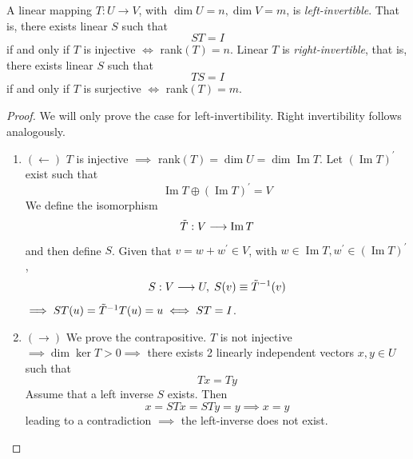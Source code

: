 \documentclass{article}
\DeclareMathOperator{\im}{Im}
\begin{document}
    \begin{theorem}
      A linear mapping $T: U \longrightarrow V$, with $\dim{U} = n, \dim{V} = m$, is \textit{left-invertible}. That is, there exists linear $S$ such that 
      \begin{equation}
        S T = I
      \end{equation}
      if and only if $T$ is injective $\iff$ rank$(T) = n$. Linear $T$ is \textit{right-invertible}, that is, there exists linear $S$ such that 
      \begin{equation}
        T S = I
      \end{equation}
      if and only if $T$ is surjective $\iff$ rank$(T) = m$. 
    \end{theorem}
    \begin{proof}
      We will only prove the case for left-invertibility. Right invertibility follows analogously. 
      \begin{enumerate}
        \item $(\leftarrow)$ $T$ is injective $\implies$ rank$(T) = \dim{U} = \dim{\im{T}}$. Let $(\im{T})^\prime$ exist such that 
        \begin{equation}
          \im{T} \oplus (\im{T})^\prime = V
        \end{equation}
        We define the isomorphism 
        \begin{equation}
          \Tilde{T}: V \longrightarrow \im{T}
        \end{equation}
        and then define $S$. Given that $v = w + w^\prime \in V$, with $w \in \im{T}, w^\prime \in (\im{T})^\prime$, 
        \begin{equation}
          S : V \longrightarrow U, \; S(v) \equiv \Tilde{T}^{-1} (v)
        \end{equation}
        $\implies S T (u) = \Tilde{T}^{-1} T (u) = u \iff S T = I$. 

        \item $(\rightarrow)$ We prove the contrapositive. $T$ is not injective $\implies \dim{\ker{T}} > 0 \implies $ there exists 2 linearly independent vectors $x, y \in U$ such that
        \begin{equation}
          T x = T y
        \end{equation}
        Assume that a left inverse $S$ exists. Then 
        \begin{equation}
          x = S T x = S T y = y \implies x = y
        \end{equation}
        leading to a contradiction $\implies$ the left-inverse does not exist. 
      \end{enumerate}
    \end{proof}
\end{document}
